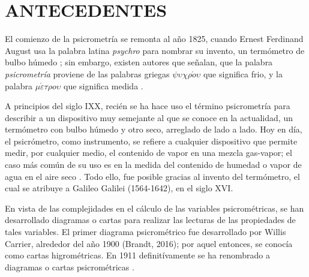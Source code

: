 \section{ANTECEDENTES}
\label{cap1:sec:antecedente}




El comienzo de la psicrometría se remonta al año 1825, cuando Ernest Ferdinand August usa la palabra latina \textit{psychro} para nombrar su invento, un termómetro de bulbo húmedo \parencite[ p. 9]{Gatley2013}; sin embargo, existen autores que señalan, que la palabra \textit{psicrometría} proviene de las palabras griegas $\psi \upsilon \chi \rho \acute{o} \upsilon $ que significa frio, y la palabra $\mu \acute{\varepsilon} \tau  \rho o \upsilon$ que significa medida \parencite{Shallcross1997}. 


A principios del siglo IXX, recién se ha hace uso el término psicrometría para describir a un dispositivo muy semejante al que se conoce en la actualidad, un termómetro con bulbo húmedo y otro seco, arreglado de lado a lado. Hoy en día, el psicrómetro, como instrumento, se refiere a cualquier dispositivo que permite medir, por cualquier medio, el contenido de vapor en una mezcla gas-vapor; el caso más común de su uso es en la medida del contenido de humedad o vapor de agua en el aire seco \parencite{Shallcross1997}. Todo ello, fue posible gracias al invento del termómetro, el cual se atribuye a Galileo Galilei (1564-1642), en el siglo XVI.

En vista de las complejidades en el cálculo de las variables psicrométricas, se han desarrollado diagramas o cartas para realizar las lecturas de las propiedades de tales variables. 
El primer diagrama psicrométrico fue desarrollado por Willis Carrier, alrededor del año 1900 (Brandt, 2016); por aquel entonces, se  conocía como cartas higrométricas. En 1911 definitívamente se ha renombrado a diagramas o cartas psicrométricas \parencite[ p. 10]{Gatley2013}.%

